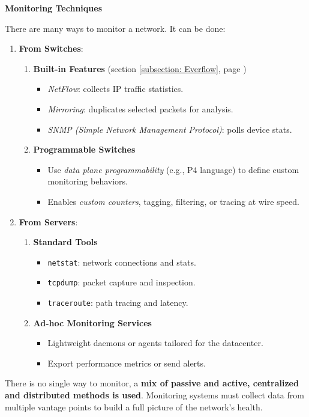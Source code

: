 \highspace
\begin{flushleft}
    \textcolor{Green3}{ \textbf{Monitoring Techniques}}
\end{flushleft}
There are many ways to monitor a network. It can be done:
\begin{enumerate}
    \item \textbf{From Switches}:
    \begin{enumerate}
        \item \textbf{Built-in Features} (section \ref{subsection: Everflow}, page \pageref{subsection: Everflow})
        \begin{itemize}
            \item \emph{NetFlow}: collects IP traffic statistics.
            \item \emph{Mirroring}: duplicates selected packets for analysis.
            \item \emph{SNMP (Simple Network Management Protocol)}: polls device stats.
        \end{itemize}
        \item \textbf{Programmable Switches}
        \begin{itemize}
            \item Use \emph{data plane programmability} (e.g., P4 language) to define custom monitoring behaviors.
            \item Enables \emph{custom counters}, tagging, filtering, or tracing at wire speed.
        \end{itemize}
    \end{enumerate}
    
    \item \textbf{From Servers}:
    \begin{enumerate}
        \item \textbf{Standard Tools}
        \begin{itemize}
            \item \texttt{netstat}: network connections and stats.
            \item \texttt{tcpdump}: packet capture and inspection.
            \item \texttt{traceroute}: path tracing and latency.
        \end{itemize}
        \item \textbf{Ad-hoc Monitoring Services}
        \begin{itemize}
            \item Lightweight daemons or agents tailored for the datacenter.
            \item Export performance metrics or send alerts.
        \end{itemize}
    \end{enumerate}
\end{enumerate}
There is no single way to monitor, a \textbf{mix of passive and active, centralized and distributed methods is used}. Monitoring systems must collect data from multiple vantage points to build a full picture of the network's health.

